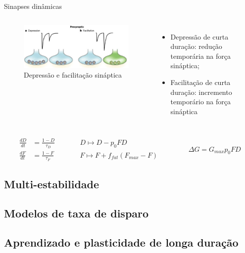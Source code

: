 \begin{frame}{Sinapses dinâmicas}
	\begin{columns}[t]
		\column{5cm}
			\begin{figure}[tb]
				\centering
				\caption{Depressão e facilitação sináptica}
				\label{fig:plasticidadecurtaduracao}
				\includegraphics[width=0.9\linewidth]{figs/plasticidade_curta_duracao}
			\end{figure}
		\column{5cm}
		\begin{itemize}
			\item Depressão de curta duração: redução temporária na força sináptica;
			\item Facilitação de curta duração: incremento temporário na força sináptica
		\end{itemize}
	\end{columns}
	\[
		\begin{aligned}
			\frac{dD}{dt}&=\frac{1-D}{\tau_D} &\qquad &D\mapsto D-p_0FD\\
			\frac{dF}{dt}&=\frac{1-F}{\tau_F} &\qquad &F\mapsto F+f_{fat}(F_{max}-F)
		\end{aligned}
		\qquad\qquad \Delta G=G_{max}p_0FD
	\]
\end{frame}

\subsection{Multi-estabilidade}

\subsection{Modelos de taxa de disparo}

\subsection{Aprendizado e plasticidade de longa duração}
